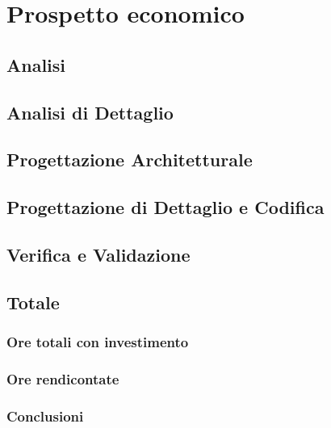 \section{Prospetto economico}
\subsection{Analisi}
\subsection{Analisi di Dettaglio}
\subsection{Progettazione Architetturale}
\subsection{Progettazione di Dettaglio e Codifica}
\subsection{Verifica e Validazione}
\subsection{Totale}
\subsubsection{Ore totali con investimento}
\subsubsection{Ore rendicontate}
\subsubsection{Conclusioni}